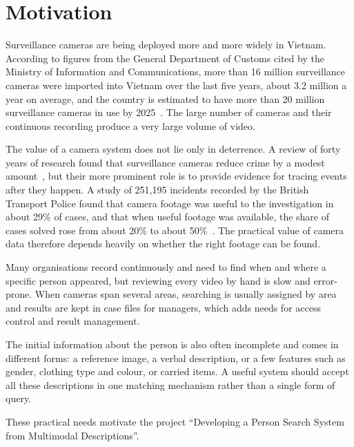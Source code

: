 \section{Motivation}
\label{sec:1.1}

Surveillance cameras are being deployed more and more widely in Vietnam. According to figures from the General Department of Customs cited by the Ministry of Information and Communications, more than 16 million surveillance cameras were imported into Vietnam over the last five years, about 3.2 million a year on average, and the country is estimated to have more than 20 million surveillance cameras in use by 2025~\cite{vnexpress2024camera}. The large number of cameras and their continuous recording produce a very large volume of video.

The value of a camera system does not lie only in deterrence. A review of forty years of research found that surveillance cameras reduce crime by a modest amount~\cite{piza2019cctv}, but their more prominent role is to provide evidence for tracing events after they happen. A study of 251,195 incidents recorded by the British Transport Police found that camera footage was useful to the investigation in about 29\% of cases, and that when useful footage was available, the share of cases solved rose from about 20\% to about 50\%~\cite{ashby2017cctv}. The practical value of camera data therefore depends heavily on whether the right footage can be found.

Many organisations record continuously and need to find when and where a specific person appeared, but reviewing every video by hand is slow and error-prone. When cameras span several areas, searching is usually assigned by area and results are kept in case files for managers, which adds needs for access control and result management.

The initial information about the person is also often incomplete and comes in different forms: a reference image, a verbal description, or a few features such as gender, clothing type and colour, or carried items. A useful system should accept all these descriptions in one matching mechanism rather than a single form of query.

These practical needs motivate the project ``Developing a Person Search System from Multimodal Descriptions''.
